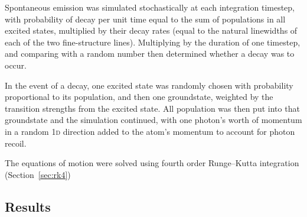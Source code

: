 Spontaneous emission was simulated stochastically at each integration timestep, with probability of decay per unit time equal to the sum of populations in all excited states, multiplied by their decay rates (equal to the natural linewidths of each of the two fine-structure lines). Multiplying by the duration of one timestep, and comparing with a random number then determined whether a decay was to occur.

In the event of a decay, one excited state was randomly chosen with probability proportional to its population, and then one groundstate, weighted by the transition strengths from the excited state. All population was then put into that groundstate and the simulation continued, with one photon's worth of momentum in a random \textsc{1d} direction added to the atom's momentum to account for photon recoil.

The equations of motion were solved using fourth order Runge--Kutta integration (Section~\ref{sec:rk4})

\subsection{Results}

